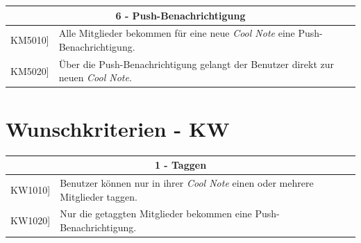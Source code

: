 \documentclass[a4paper]{scrreprt}
\begin{document}
    	\vspace{5mm}
    	
    	\begin{table}[h!]
    		\centering
    		\label{my-label}
    		\begin{tabular}{p{2cm}p{12cm}}
    			
    			\multicolumn{2}{c}{\textbf{6 - Push-Benachrichtigung}} \\ \hline
    			\centering{[}KM5010{]} & Alle Mitglieder bekommen für eine neue \textit{Cool Note} eine Push-Benachrichtigung.\\
    			\centering{[}KM5020{]}& Über die Push-Benachrichtigung gelangt der Benutzer direkt zur neuen \textit{Cool Note}.                               \\
    			
    			\hline
    		\end{tabular}
    	\end{table}
    	
    	\vspace{1cm}    	
    	
    	\clearpage

        \section{Wunschkriterien - KW}
		\begin{table}[h!]
			\centering
			\label{my-label}
			\begin{tabular}{p{2cm}p{12cm}}
				
				\multicolumn{2}{c}{\textbf{1 - Taggen}} \\ \hline
				\centering{[}KW1010{]} & Benutzer können nur in ihrer \textit{Cool Note} einen oder mehrere Mitglieder taggen.\\
				\centering{[}KW1020{]}& Nur die getaggten Mitglieder bekommen eine Push-Benachrichtigung.                               \\
				\hline
			\end{tabular}
		\end{table}
		
		\vspace{5mm}
		
\end{document}
